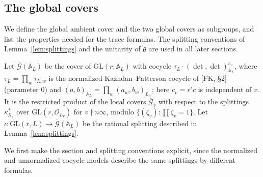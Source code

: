 \documentclass[12pt]{article}
\newcommand{\ov}[1]{\overline{#1}}
\newcommand{\A}{\mathbb{A}}
\newcommand{\cO}{\mathcal{O}}
\newcommand{\GL}{\mathrm{GL}}
\newcommand{\ks}{\kappa^{*}}
\newcommand{\cG}{\mathcal{G}}
\newcommand{\cGb}{\ov{\mathcal{G}}}
\theoremstyle{plain}
\theoremstyle{definition}
\begin{document}
\subsection{The global covers}\label{subsec:globalcovers}
We define the global ambient cover and the two global covers as subgroups, and list the properties needed for the trace formulas. The splitting conventions of Lemma~\ref{lem:splittings} and the unitarity of $\tilde\theta$ are used in all later sections.

Let $\cGb(\A_L)$ be the cover of $\GL(r,\A_L)$ with cocycle $\tau_L\cdot(\det,\det)_{\A_L}^{c_v}$, where $\tau_L=\prod_w\tau_{L,w}$ is the normalized Kazhdan--Patterson cocycle of [FK, \S2] (parameter $0$) and $(a,b)_{\A_L}=\prod_w(a_w,b_w)_{L_w}$; here $c_v=r'c$ is independent of $v$. It is the restricted product of the local covers $\cGb_v$ with respect to the splittings $\ks_{\cG_v}$ over $\GL(r,\cO_{L_v})$ for $v\nmid n\infty$, modulo $\{(\zeta_v):\prod\zeta_v=1\}$. Let $\iota:\GL(r,L)\to\cGb(\A_L)$ be the rational splitting described in Lemma~\ref{lem:splittings}.

We first make the section and splitting conventions explicit, since the normalized and unnormalized cocycle models describe the same splittings by different formulas.
\end{document}
